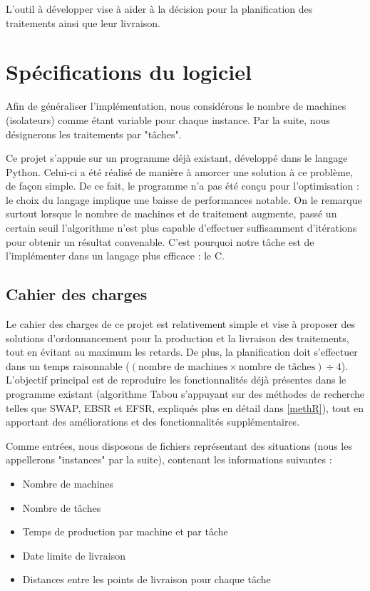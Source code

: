 \documentclass[hideweeklyreports]{polytech/polytech}
\begin{document}
		L'outil à développer vise à aider à la décision pour la planification des traitements ainsi que leur livraison.
		
	\chapter{Spécifications du logiciel}
		Afin de généraliser l'implémentation, nous considérons le nombre de machines (isolateurs) comme étant variable pour chaque instance. Par la suite, nous désignerons les traitements par "tâches".
		
		Ce projet s'appuie sur un programme déjà existant, développé dans le langage Python. Celui-ci a été réalisé de manière à amorcer une solution à ce problème, de façon simple. De ce fait, le programme n'a pas été conçu pour l'optimisation : le choix du langage implique une baisse de performances notable. On le remarque surtout lorsque le nombre de machines et de traitement augmente, passé un certain seuil l'algorithme n'est plus capable d'effectuer suffisamment d'itérations pour obtenir un résultat convenable. C'est pourquoi notre tâche est de l'implémenter dans un langage plus efficace : le C.
		\section{Cahier des charges}
			Le cahier des charges de ce projet est relativement simple et vise à proposer des solutions d'ordonnancement pour la production et la livraison des traitements, tout en évitant au maximum les retards. De plus, la planification doit s'effectuer dans un temps raisonnable ($(\text{nombre de machines}\times \text{nombre de tâches})\div 4$). L'objectif principal est de reproduire les fonctionnalités déjà présentes dans le programme existant (algorithme Tabou s'appuyant sur des méthodes de recherche telles que SWAP, EBSR et EFSR, expliqués plus en détail dans \autoref{methR}), tout en apportant des améliorations et des fonctionnalités supplémentaires.
			
			Comme entrées, nous disposons de fichiers représentant des situations (nous les appellerons "instances" par la suite), contenant les informations suivantes :
			\begin{itemize}
				\item Nombre de machines
				\item Nombre de tâches
				\item Temps de production par machine et par tâche
				\item Date limite de livraison
				\item Distances entre les points de livraison pour chaque tâche
			\end{itemize}
			
\end{document}

